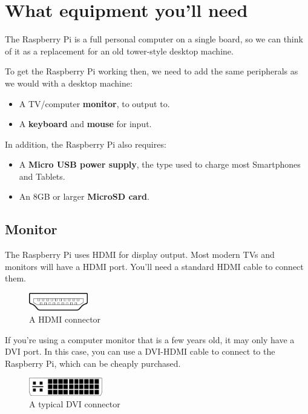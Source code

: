\section{What equipment you'll need}
\label{sec:PiEquiptment}

	The Raspberry Pi is a full personal computer on a single board, so we can think of it as a replacement for an old tower-style desktop machine.
	
	To get the Raspberry Pi working then, we need to add the same peripherals as we would with a desktop machine:
	
	\begin{itemize}[nosep]
		\item A TV/computer \textbf{monitor}, to output to.
		\item A \textbf{keyboard} and \textbf{mouse} for input.
	\end{itemize}
		
	In addition, the Raspberry Pi also requires:
	\begin{itemize}[nosep]
		\item A \textbf{Micro USB power supply}, the type used to charge most Smartphones and Tablets.
		\item An 8GB or larger \textbf{MicroSD card}.
	\end{itemize}
	
	\subsection*{Monitor}
	
		The Raspberry Pi uses HDMI for display output. Most modern TVs and monitors will have a HDMI port. You'll need a standard HDMI cable to connect them.
		
		\begin{figure}[h]
			\centering
			\includegraphics[height=22pt]{000_IntroToPi/1_EquipmentNeeded/HDMI}
			\\A HDMI connector
		\end{figure}
		
		If you're using a computer monitor that is a few years old, it may only have a DVI port. In this case, you can use a DVI-HDMI cable to connect to the Raspberry Pi, which can be cheaply purchased.
	
		\begin{figure}[h]
			\centering
			\includegraphics[height=22pt]{000_IntroToPi/1_EquipmentNeeded/DVI}
			\\A typical DVI connector
		\end{figure}
		
